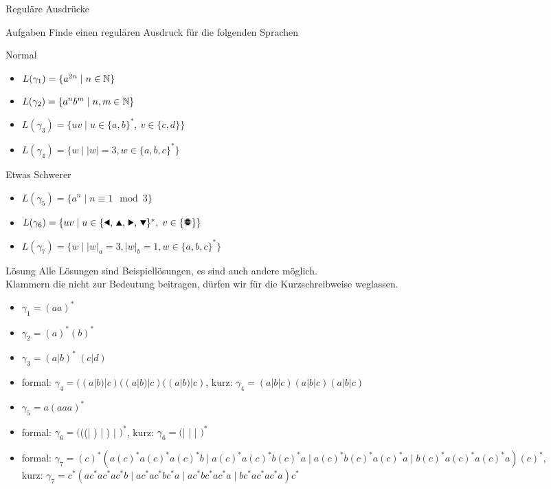 \documentclass[10pt]{beamer}
\begin{document}
{
\begin{frame}{Reguläre Ausdrücke}
    \begin{alertblock}{Aufgaben}
    Finde einen regulären Ausdruck für die folgenden Sprachen
    \end{alertblock}
    \begin{block}{Normal}
    \begin{itemize}
        \item $L(\gamma_1) = \{a^{2n} \mid n\in\mathbb{N}\}$
        \item $L(\gamma_2) = \{a^nb^m \mid n, m\in\mathbb{N}\}$
        \item $L(\gamma_3) = \{uv \mid u\in\{a,b\}^\ast,\ v\in\{c,d\}\}$
        \item $L(\gamma_4) = \{w \mid |w| = 3, w\in \{a,b,c\}^*\}$
    \end{itemize}
    \end{block}
    \begin{block}{Etwas Schwerer}
    \begin{itemize}
        \item $L(\gamma_5) = \{a^n \mid n \equiv 1 \mod 3\}$
        \item $L(\gamma_6) = \{uv\mid u\in\{\text{\Rewind, \MoveUp, \Forward, \MoveDown}\}^\ast,\;v\in\{\text{\Stopsign}\}\}$
        \item $L(\gamma_7) = \{w \mid |w|_a = 3, |w|_b = 1, w\in \{a,b,c\}^*\}$
    \end{itemize}
    \end{block}
\end{frame}
}

{
\begin{frame}{Lösung}
    Alle Lösungen sind Beispiellösungen, es sind auch andere möglich.\\
    Klammern die nicht zur Bedeutung beitragen, dürfen wir für die Kurzschreibweise weglassen.
    \begin{itemize}[<+- | alert@+>]
        \item $\gamma_1 = (aa)^*$
        \item $\gamma_2 = (a)^*(b)^*$
        \item $\gamma_3 = (a|b)^*\ (c|d)$
        \item formal: $\gamma_4 = ((a|b)|c)((a|b)|c)((a|b)|c)$, kurz: $\gamma_4 = (a|b|c)(a|b|c)(a|b|c)$
        \item $\gamma_5 = a(aaa)^*$
        \item formal: $\gamma_6 = ($((\Rewind | \MoveUp) | \Forward) | \MoveDown$)^*$\Stopsign, kurz: $\gamma_6 = ($\Rewind | \MoveUp | \Forward | \MoveDown$)^*$\Stopsign
        \item formal: $\gamma_7 = (c)^*(a(c)^*a(c)^*a(c)^*b\mid a(c)^*a(c)^*b(c)^*a\mid a(c)^*b(c)^*a(c)^*a\mid b(c)^*a(c)^*a(c)^*a)(c)^*$,\\kurz: $\gamma_7 = c^*(ac^*ac^*ac^*b\mid ac^*ac^*bc^*a\mid ac^*bc^*ac^*a\mid bc^*ac^*ac^*a)c^*$ 
    \end{itemize}
\end{frame}
}
\end{document}
